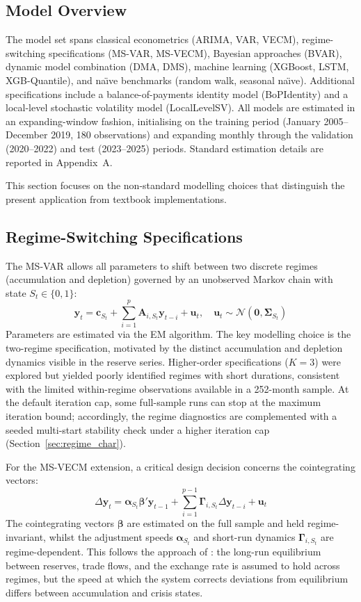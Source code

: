 \documentclass[12pt,a4paper]{article}
\begin{document}
\subsection{Model Overview}

The model set spans classical econometrics (ARIMA, VAR, VECM), regime-switching specifications (MS-VAR, MS-VECM), Bayesian approaches (BVAR), dynamic model combination (DMA, DMS), machine learning (XGBoost, LSTM, XGB-Quantile), and na\"{\i}ve benchmarks (random walk, seasonal na\"{\i}ve). Additional specifications include a balance-of-payments identity model (BoPIdentity) and a local-level stochastic volatility model (LocalLevelSV). All models are estimated in an expanding-window fashion, initialising on the training period (January 2005--December 2019, 180 observations) and expanding monthly through the validation (2020--2022) and test (2023--2025) periods. Standard estimation details are reported in Appendix~A.

This section focuses on the non-standard modelling choices that distinguish the present application from textbook implementations.

\subsection{Regime-Switching Specifications}

The MS-VAR allows all parameters to shift between two discrete regimes (accumulation and depletion) governed by an unobserved Markov chain with state $S_t \in \{0, 1\}$:
\[
\mathbf{y}_t = \mathbf{c}_{S_t} + \sum_{i=1}^{p} \mathbf{A}_{i,S_t} \mathbf{y}_{t-i} + \mathbf{u}_t, \quad \mathbf{u}_t \sim \mathcal{N}(\mathbf{0}, \boldsymbol{\Sigma}_{S_t})
\]
Parameters are estimated via the EM algorithm. The key modelling choice is the two-regime specification, motivated by the distinct accumulation and depletion dynamics visible in the reserve series. Higher-order specifications ($K = 3$) were explored but yielded poorly identified regimes with short durations, consistent with the limited within-regime observations available in a 252-month sample. At the default iteration cap, some full-sample runs can stop at the maximum iteration bound; accordingly, the regime diagnostics are complemented with a seeded multi-start stability check under a higher iteration cap (Section~\ref{sec:regime_char}).

For the MS-VECM extension, a critical design decision concerns the cointegrating vectors:
\[
\Delta \mathbf{y}_t = \boldsymbol{\alpha}_{S_t} \boldsymbol{\beta}' \mathbf{y}_{t-1} + \sum_{i=1}^{p-1} \boldsymbol{\Gamma}_{i,S_t} \Delta \mathbf{y}_{t-i} + \mathbf{u}_t
\]
The cointegrating vectors $\boldsymbol{\beta}$ are estimated on the full sample and held regime-invariant, whilst the adjustment speeds $\boldsymbol{\alpha}_{S_t}$ and short-run dynamics $\boldsymbol{\Gamma}_{i,S_t}$ are regime-dependent. This follows the approach of \cite{Krolzig1997}: the long-run equilibrium between reserves, trade flows, and the exchange rate is assumed to hold across regimes, but the speed at which the system corrects deviations from equilibrium differs between accumulation and crisis states.
\end{document}
